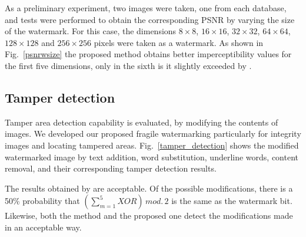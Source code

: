 \documentclass[runningheads]{llncs}
\begin{document}
As a preliminary experiment, two images were taken, one from each database, and tests were performed to obtain the corresponding PSNR by varying the size of the watermark. For this case, the dimensions $8\times 8$, $16\times 16$, $32\times 32$, $64\times 64$, $128\times 128$ and $256\times 256$ pixels were taken as a watermark. As shown in Fig.~\ref{psnrwsize} the proposed method obtains better imperceptibility values for the first five dimensions, only in the sixth is it slightly exceeded by \cite{shivani2017dual}.

\subsection{Tamper detection}
Tamper area detection capability is evaluated, by modifying the contents of images. We developed our proposed fragile watermarking particularly for integrity images and locating tampered areas. Fig.~\ref{tamper_detection} shows the modified watermarked image by text addition, word substitution, underline words, content removal, and their corresponding tamper detection results.

The results obtained by \cite{shivani2017dual} are acceptable. Of the possible modifications, there is a 50\% probability that $\left( \sum_{m=1}^{5}XOR\right)\,  mod.\, 2$ is the same as the watermark bit. Likewise, both the \cite{liu2018blind} method and the proposed one detect the modifications made in an acceptable way.
\end{document}
